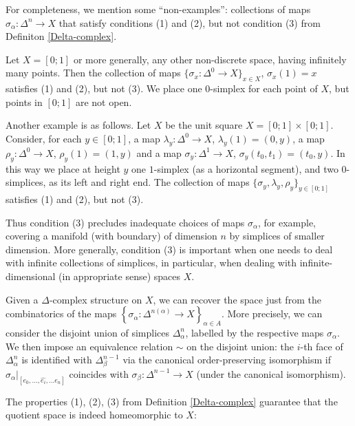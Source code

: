 \documentclass[11pt,a4paper]{report}
\begin{document}
	  For completeness, we mention  some ``non-examples'': collections of maps $\sigma_\alpha:\Delta^n\to X$ that satisfy conditions (1) and (2), but not condition (3) from Definiton \ref{Delta-complex}.
     \begin{Ex}
     	Let $X=[0;1]$ or more generally, any other non-discrete space, having infinitely many points. Then the collection
     	of  maps $\{\sigma_x:\Delta^0\to X\}_{x\in X}$, $\sigma_x(1)=x$ 
     	satisfies (1) and (2), but not (3). We place  one $0$-simplex for each point of $X$, but  points in $[0;1]$ are not open.
     	
     	Another  example is as follows. Let $X$ be the unit square $X=[0;1]\times [0;1]$. Consider, for each $y\in [0;1]$, a  map
     	$\lambda_y:\Delta^0\to X$, $\lambda_y(1)=(0,y)$, a map $\rho_y:\Delta^0\to X$, $\rho_y(1)=(1,y)$ and a map
     	$\sigma_y:\Delta^1\to X$, $\sigma_y(t_0,t_1)= (t_0,y)$. In this way we place  at height $y$ one $1$-simplex (as a horizontal segment), 
     	and two $0$-simplices, as its left and right end. The collection of maps $\{\sigma_y, \lambda_y, \rho_y\}_{y\in[0;1]}$ satisfies (1) and (2), 
     	but not (3).
     \end{Ex}
	  Thus condition (3) precludes inadequate choices of maps $\sigma_\alpha$, for example, covering a manifold (with boundary) of dimension $n$ by simplices
	  of smaller dimension.
	  More generally, condition (3) is important when one needs to deal with  infinite collections of simplices, in particular, when dealing with
	  infinite-dimensional (in appropriate sense) spaces $X$.
	  
	  
	  
	  Given a $\Delta$-complex structure on $X$, we can recover the space just from the combinatorics of the maps $\left\{\sigma_\alpha:\Delta^{n(\alpha)}\to X\right\}_{\alpha\in A}$.
	  More precisely, we can consider the disjoint union of  simplices $\Delta_\alpha^n$, labelled by the respective maps $\sigma_\alpha$. We then impose an
	  equivalence relation $\sim$ on the disjoint union: the $i$-th face of $\Delta^n_\alpha$ is identified with $\Delta^{n-1}_\beta$ 
	  via the canonical order-preserving isomorphism
	  if $\left. \sigma_\alpha\right|_{[e_0,\ldots, \widehat{e_i},\ldots e_n]}$
	  coincides with $\sigma_\beta:\Delta^{n-1}\to X$ (under the canonical isomorphism).
	  
	  The properties (1), (2), (3) from Definition \ref{Delta-complex} guarantee that the quotient space is indeed homeomorphic to $X$:
	  
\end{document}
